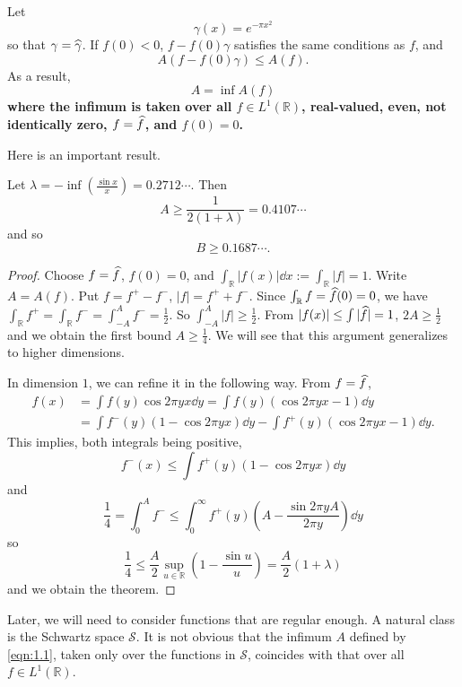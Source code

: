 Let
\[
    \gamma(x) = e^{-\pi x^2}
\]
so that $\gamma = \widehat{\gamma}$.
If $f(0) < 0$, $f - f(0)\gamma$ satisfies the same conditions as $f$, and
\[
    A(f - f(0)\gamma) \leq A(f).
\]
As a result,
\begin{equation}
\label{eqn:1.1}
    A = \inf A(f)
\end{equation}
\textbf{where the infimum is taken over all $f \in L^{1}(\mathbb{R})$, real-valued, even, not identically zero, $f = \widehat{f}$, and $f(0) = 0$.}

Here is an important result.

\begin{theorem}
Let $\lambda = -\inf\left( \frac{\sin x}{x}\right) = 0.2712\cdots$.
Then
\[
    A \geq \frac{1}{2(1 + \lambda)} = 0.4107\cdots
\]
and so
\[
    B \geq 0.1687\cdots.
\]
\end{theorem}
\begin{proof}
Choose $f = \widehat{f}$, $f(0) = 0$, and $\int_{\mathbb{R}} |f(x)| \dd x := \int_{\mathbb{R}} |f| = 1$.
Write $A = A(f)$.
Put $f = f^{+} - f^{-}$, $|f| = f^{+} + f^{-}$.
Since $\int_{\mathbb{R}}f = \widehat{f}(0) = 0$, we have $\int_{\mathbb{R}} f^{+} = \int_{\mathbb{R}} f^{-} = \int_{-A}^{A} f^{-} = \frac{1}{2}$.
So $\int_{-A}^{A} |f| \geq \frac{1}{2}$.
From $|f(x)| \leq \int |\widehat{f}| = 1$, $2A \geq \frac{1}{2}$ and we obtain the first bound $A \geq \frac{1}{4}$.
We will see that this argument generalizes to higher dimensions.

In dimension $1$, we can refine it in the following way.
From $f = \widehat{f}$,
\begin{align*}
    f(x) &= \int f(y) \cos 2 \pi y x \dd y = \int f(y) (\cos 2 \pi y x - 1) \dd y \\
    &= \int f^{-}(y) (1 - \cos 2 \pi y x) \dd y - \int f^{+}(y) (\cos 2 \pi y x - 1) \dd y.
\end{align*}
This implies, both integrals being positive,
\[
    f^{-}(x) \leq \int f^{+}(y) (1 - \cos 2 \pi y x) \dd y
\]
and
\[
    \frac{1}{4} = \int_{0}^{A} f^{-} \leq \int_{0}^{\infty} f^{+}(y) \left(A - \frac{\sin 2 \pi y A}{2 \pi y}\right) \dd y
\]
so
\[
    \frac{1}{4} \leq \frac{A}{2}\sup_{u \in \mathbb{R}} \left(1 - \frac{\sin u}{u}\right) = \frac{A}{2}(1 + \lambda)
\]
and we obtain the theorem.
\end{proof}
Later, we will need to consider functions that are regular enough.
A natural class is the Schwartz space $\mathcal{S}$.
It is not obvious that the infimum $A$ defined by \eqref{eqn:1.1}, taken only over the functions in $\mathcal{S}$, coincides with that over all $f \in L^{1}(\mathbb{R})$.

